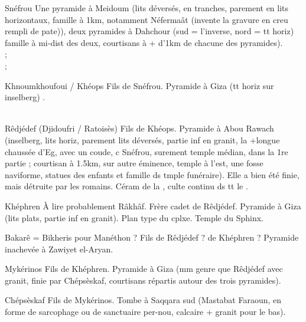 \begin{listerois}
  \item [Snéfrou] Une pyramide à Meidoum (lits déversés, en tranches, 
        parement en lits horizontaux, famille à 1km, notamment 
        Néfermaât 
        (invente la gravure en creu rempli de pate)), deux pyramides à
        Dahchour (sud = l'inverse, nord = tt horiz) famille à mi-dist 
        des deux, courtisans à + d'1km de chacune des pyramides). \\
         ; \\
         ; \\
  \item [Khnoumkhoufoui / Khéops] Fils de Snéfrou. Pyramide à Giza 
        (tt horiz sur inselberg) . \\
         \\
  \item [Rêdjédef (Djidoufri / Ratoisès)] Fils de Khéops. 
        Pyramide à Abou Rawach (inselberg, lits horiz, parement lits 
        déversés, partie inf en granit, la +longue chaussée d'Eg, 
        avec un coude, c Snéfrou, surement temple médian, dans la 
        1re partie ;
        courtisan à 1.5km, sur autre éminence, temple à l'est, une 
        fosse naviforme, statues des enfants et famille ds tmple 
        funéraire).
        Elle a bien été finie, mais détruite par les romains. Céram de 
        la , culte continu ds tt le \MK.
  \item [Khéphren] À lire probablement Râkhâf. Frère cadet de 
        Rêdjédef. Pyramide à Giza (lits plats, partie inf en granit). 
        Plan type du cplxe. Temple du Sphinx.
  \item [Bakarê] = Bikheris pour Manéthon ? Fils de Rêdjédef ? 
        de Khéphren ? 
        Pyramide inachevée à Zawiyet el-Aryan.
  \item [Mykérinos] Fils de Khéphren. Pyramide à Giza (mm genre que 
        Rêdjédef avec granit, finie par Chépsèskaf, courtisans 
        répartis autour des trois pyramides).
  \item [Chépsèskaf] Fils de Mykérinos. Tombe à Saqqara sud (Mastabat 
        Faraoun, en forme de sarcophage ou de sanctuaire per-nou, 
        calcaire + granit pour le bas). \\
\end{listerois}


